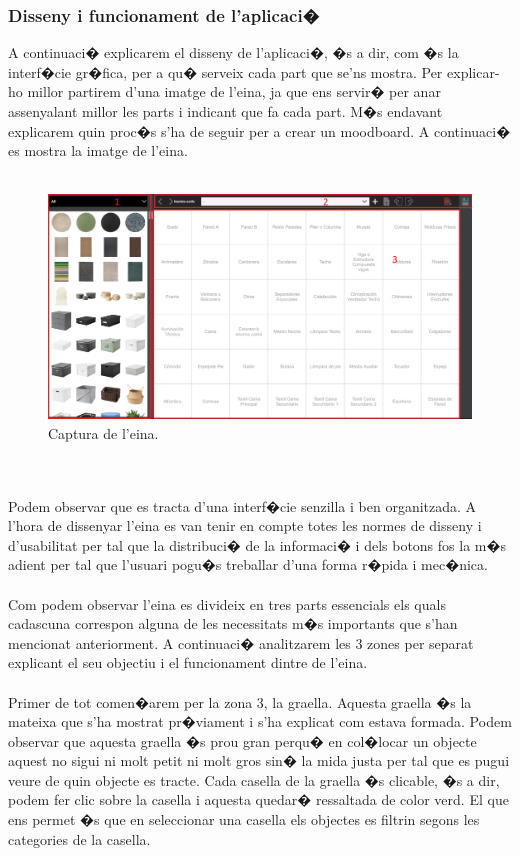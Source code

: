 \documentclass[12pt,a4paper,openright,oneside]{article}
\numberwithin{equation}{section}
\theoremstyle{definition}
\begin{document}
\subsubsection{Disseny i funcionament de l'aplicaci�}
A continuaci� explicarem el disseny de l'aplicaci�, �s a dir, com �s la interf�cie gr�fica, per a qu� serveix cada part que se'ns mostra. Per explicar-ho millor partirem d'una imatge de l'eina, ja que ens servir� per anar assenyalant millor les parts i indicant que fa cada part. M�s endavant explicarem quin proc�s s'ha de seguir per a crear un moodboard. A continuaci� es mostra la imatge de l'eina.\\\\
\begin{figure}[h!]
\begin{center}
\includegraphics[width=\textwidth]{eina}
\caption{Captura de l'eina.}
\end{center}
\end{figure}
\\\\
Podem observar que es tracta d'una interf�cie senzilla i ben organitzada. A l'hora de dissenyar l'eina es van tenir en compte totes les normes de disseny i d'usabilitat per tal que la distribuci� de la informaci� i dels botons fos la m�s adient per tal que l'usuari pogu�s treballar d'una forma r�pida i mec�nica.\\\\
Com podem observar l'eina es divideix en tres parts essencials els quals cadascuna correspon alguna de les necessitats m�s importants que s'han mencionat anteriorment. A continuaci� analitzarem les 3 zones per separat explicant el seu objectiu i el funcionament dintre de l'eina.\\\\
Primer de tot comen�arem per la zona 3, la graella. Aquesta graella �s la mateixa que s'ha mostrat pr�viament i s'ha explicat com estava formada. Podem observar que aquesta graella �s prou gran perqu� en col�locar un objecte aquest no sigui ni molt petit ni molt gros sin� la mida justa per tal que es pugui veure de quin objecte es tracte. Cada casella de la graella �s clicable, �s a dir, podem fer clic sobre la casella i aquesta quedar� ressaltada de color verd. El que ens permet �s que en seleccionar una casella els objectes es filtrin segons les categories de la casella. \\\\
\end{document}

